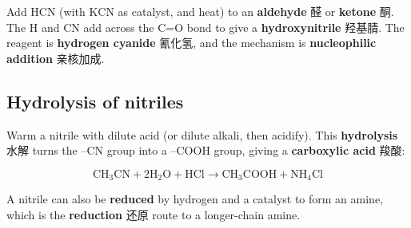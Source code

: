 \documentclass[11pt]{article}
\begin{document}
Add $\text{HCN}$ (with $\text{KCN}$ as catalyst, and heat) to an \textbf{aldehyde} 醛 or \textbf{ketone} 酮. The $\text{H}$ and $\text{CN}$ add across the C=O bond to give a \textbf{hydroxynitrile} 羟基腈. The reagent is \textbf{hydrogen cyanide} 氰化氢, and the mechanism is \textbf{nucleophilic addition} 亲核加成.

\subsection*{Hydrolysis of nitriles}

Warm a nitrile with dilute acid (or dilute alkali, then acidify). This \textbf{hydrolysis} 水解 turns the $\text{–CN}$ group into a $\text{–COOH}$ group, giving a \textbf{carboxylic acid} 羧酸:

\[
\text{CH}_3\text{CN} + 2\text{H}_2\text{O} + \text{HCl} \rightarrow \text{CH}_3\text{COOH} + \text{NH}_4\text{Cl}
\]

A nitrile can also be \textbf{reduced} by hydrogen and a catalyst to form an amine, which is the \textbf{reduction} 还原 route to a longer-chain amine.
\end{document}
